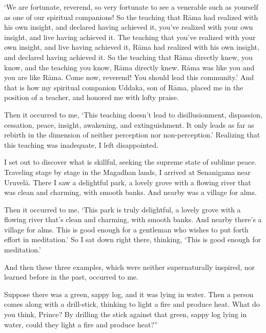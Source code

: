 \documentclass[12pt,openany]{book}%
\begin{document}
‘We are fortunate, reverend, so very fortunate to see a venerable such as yourself as one of our spiritual companions! So the teaching that \textsanskrit{Rāma} had realized with his own insight, and declared having achieved it, you've realized with your own insight, and live having achieved it. The teaching that you’ve realized with your own insight, and live having achieved it, \textsanskrit{Rāma} had realized with his own insight, and declared having achieved it. So the teaching that \textsanskrit{Rāma} directly knew, you know, and the teaching you know, \textsanskrit{Rāma} directly knew. \textsanskrit{Rāma} was like you and you are like \textsanskrit{Rāma}. Come now, reverend! You should lead this community.’ And that is how my spiritual companion Uddaka, son of \textsanskrit{Rāma}, placed me in the position of a teacher, and honored me with lofty praise. 

Then it occurred to me, ‘This teaching doesn’t lead to disillusionment, dispassion, cessation, peace, insight, awakening, and extinguishment. It only leads as far as rebirth in the dimension of neither perception nor non-perception.’ Realizing that this teaching was inadequate, I left disappointed. 

I set out to discover what is skillful, seeking the supreme state of sublime peace. Traveling stage by stage in the Magadhan lands, I arrived at Senanigama near \textsanskrit{Uruvelā}. There I saw a delightful park, a lovely grove with a flowing river that was clean and charming, with smooth banks. And nearby was a village for alms. 

Then it occurred to me, ‘This park is truly delightful, a lovely grove with a flowing river that’s clean and charming, with smooth banks. And nearby there’s a village for alms. This is good enough for a gentleman who wishes to put forth effort in meditation.’ So I sat down right there, thinking, ‘This is good enough for meditation.’ 

And then these three examples, which were neither supernaturally inspired, nor learned before in the past, occurred to me. 

Suppose there was a green, sappy log, and it was lying in water. Then a person comes along with a drill-stick, thinking to light a fire and produce heat. What do you think, Prince? By drilling the stick against that green, sappy log lying in water, could they light a fire and produce heat?” 
\end{document}
